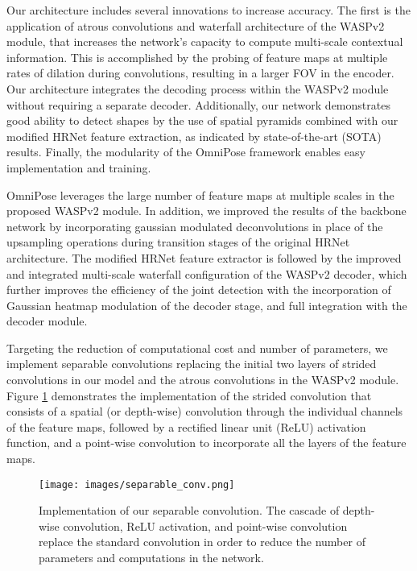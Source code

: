 \documentclass[10pt,twocolumn,letterpaper]{article}
\begin{document}
Our architecture includes several
innovations to increase accuracy. 
The first is the application of atrous convolutions and waterfall architecture of the WASPv2 module, that increases the network's capacity to compute multi-scale contextual information. This is accomplished by the probing of feature maps at multiple rates of dilation during convolutions, resulting in a larger FOV in the encoder.
Our architecture integrates the decoding process within the WASPv2 module without requiring a separate decoder.
Additionally, our network demonstrates good ability to detect shapes by the use of spatial pyramids combined with our modified HRNet feature extraction, as indicated by state-of-the-art (SOTA) results.  Finally, the modularity of the OmniPose framework enables easy implementation and training.



OmniPose leverages the large number of feature maps at multiple scales  in the proposed WASPv2 module. In addition, we improved the results of the backbone network by incorporating gaussian modulated deconvolutions in place of the upsampling operations during transition stages of the original HRNet architecture.
The modified HRNet feature extractor is followed by the improved and integrated multi-scale waterfall configuration of the WASPv2 decoder, which further improves the efficiency of the joint detection with the incorporation of Gaussian heatmap modulation of the decoder stage, and full integration with the decoder module.





Targeting the reduction of computational cost and number of parameters, we implement separable convolutions replacing the initial two layers of strided convolutions in our model and the atrous convolutions in the WASPv2 module. Figure \ref{fig:separable_conv} demonstrates the implementation of the strided convolution that consists of a spatial (or depth-wise) convolution through the individual channels of the feature maps, followed by a rectified linear unit (ReLU) activation function, and a point-wise convolution to incorporate all the layers of the feature maps.

\begin{figure}[!ht]
\begin{center}
\texttt{[image: images/separable\_conv.png]}
\end{center}
  \caption{Implementation of our separable convolution. The cascade of depth-wise convolution, ReLU activation, and point-wise convolution replace the standard convolution in order to reduce the number of parameters and computations in the network.}
\label{fig:separable_conv}
\end{figure}
\end{document}
